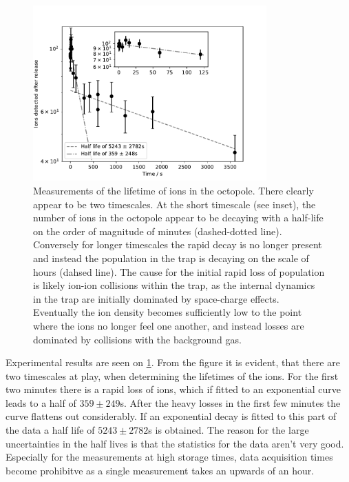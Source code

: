 \begin{figure}[h]
    \centering
    \includegraphics[width = 0.8\textwidth]{main/DecayTimes.pdf}
    \caption{Measurements of the lifetime of ions in the octopole. There clearly appear to be two timescales. At the short timescale (see inset), the number of ions in the octopole appear to be decaying with a half-life on the order of magnitude of minutes (dashed-dotted line). Conversely for longer timescales the rapid decay is no longer present and instead the population in the trap is decaying on the scale of hours (dahsed line).
    The cause for the initial rapid loss of population is likely ion-ion collisions within the trap, as the internal dynamics in the trap are initially dominated by space-charge effects. Eventually the ion density becomes sufficiently low to the point where the ions no longer feel one another, and instead losses are dominated by collisions with the background gas.}
    \label{fig:decayResults}
\end{figure}
Experimental results are seen on \cref{fig:decayResults}. From the figure it is evident, that there are two timescales at play, when determining the lifetimes of the ions.
For the first two minutes there is a rapid loss of ions, which if fitted to an exponential curve leads to a half of $359\pm249$s. After the heavy losses in the first few minutes the curve flattens out considerably. If an exponential decay is fitted to this part of the data a half life of $5243\pm2782$s is obtained. The reason for the large uncertainties in the half lives is that the statistics for the data aren't very good. Especially for the measurements at high storage times, data acquisition times become prohibitve
as a single measurement takes an upwards of an hour.

